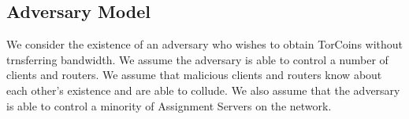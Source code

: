 \subsection{Adversary Model} We consider the existence of an adversary who
wishes to obtain TorCoins without trnsferring bandwidth. We assume the
adversary is able to control a number of clients and routers. We assume that
malicious clients and routers know about each other's existence and are able
to collude. We also assume that the adversary is able to control a minority of
Assignment Servers on the network.





